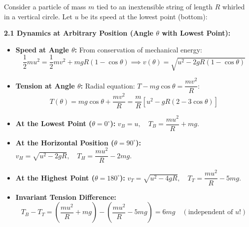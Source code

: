 \documentclass[11pt,a4paper]{article}
\begin{document}
Consider a particle of mass $m$ tied to an inextensible string of length $R$ whirled in a vertical circle. Let $u$ be its speed at the lowest point (bottom):

\begin{tcolorbox}[formulacard]
  \textbf{\textcolor{primaryDark}{2.1 Dynamics at Arbitrary Position (Angle $\theta$ with Lowest Point):}}
  \begin{itemize}[leftmargin=14pt,itemsep=2.5pt]
    \item \textbf{Speed at Angle $\theta$:} From conservation of mechanical energy:
    \[
      \frac{1}{2}mu^2 = \frac{1}{2}mv^2 + mgR(1 - \cos\theta) \implies v(\theta) = \sqrt{u^2 - 2gR(1 - \cos\theta)}
    \]
    \item \textbf{Tension at Angle $\theta$:} Radial equation: $T - mg\cos\theta = \dfrac{mv^2}{R}$:
    \[
      T(\theta) = mg\cos\theta + \frac{mv^2}{R} = \frac{m}{R}\left[u^2 - gR(2 - 3\cos\theta)\right]
    \]
    \item \textbf{At the Lowest Point ($\theta = 0^\circ$):} $v_B = u, \quad T_B = \dfrac{mu^2}{R} + mg$.
    \item \textbf{At the Horizontal Position ($\theta = 90^\circ$):} $v_H = \sqrt{u^2 - 2gR}, \quad T_H = \dfrac{mu^2}{R} - 2mg$.
    \item \textbf{At the Highest Point ($\theta = 180^\circ$):} $v_T = \sqrt{u^2 - 4gR}, \quad T_T = \dfrac{mu^2}{R} - 5mg$.
    \item \textbf{Invariant Tension Difference:}
    \[
      T_B - T_T = \left(\frac{mu^2}{R} + mg\right) - \left(\frac{mu^2}{R} - 5mg\right) = 6mg \quad (\text{independent of } u!)
    \]
  \end{itemize}
\end{tcolorbox}
\end{document}
